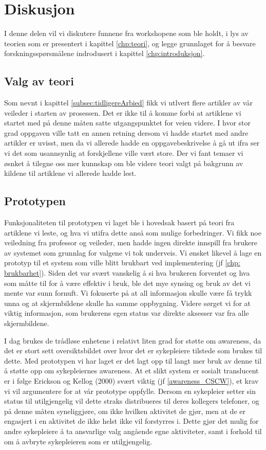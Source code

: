 \chapter{Diskusjon}
\label{chp:diskusjon}
I denne delen vil vi diskutere funnene fra workshopene som ble holdt, i lys av teorien som er presentert i kapittel \ref{chp:teori}, og legge grunnlaget for å besvare forskningsspørsmålene indrodusert i kapittel \ref{chp:introduksjon}.

\section{Valg av teori}
Som nevnt i kapittel \ref{subsec:tidligereArbied} fikk vi utlvert flere artikler av vår veileder i starten av prosessen. Det er ikke til å komme forbi at artiklene vi startet med på denne måten satte utgangspunktet for veien videre. I hvor stor grad oppgaven ville tatt en annen retning dersom vi hadde startet med andre artikler er uvisst, men da vi allerede hadde en oppgavebeskrivelse å gå ut ifra ser vi det som usannsynlig at forskjellene ville vært store.
Der vi fant temaer vi øsnket å tilegne oss mer kunnskap om ble videre teori valgt på bakgrunn av kildene til artiklene vi allerede hadde lest. 

\section{Prototypen}
\label{protoDisk}
Funksjonaliteten til prototypen vi laget ble i hovedsak basert på teori fra artiklene vi leste, og hva vi utifra dette anså som mulige forbedringer. Vi fikk noe veiledning fra professor og veileder, men hadde ingen direkte innspill fra brukere av systemet som grunnlag for valgene vi tok underveis.
Vi ønsket likevel å lage en prototyp til et system som ville blitt brukbart ved implementering (jf \ref{chp: brukbarhet}). Siden det var svært vanskelig å si hva brukeren forventet og hva som måtte til for å være effektiv i bruk, ble det mye synsing og bruk av det vi mente var sunn fornuft. Vi fokuserte på at all informasjon skulle være få trykk unna og at skjermbildene skulle ha samme oppbygning. Videre sørget vi for at viktig informasjon, som brukerens egen status var direkte aksesser var fra alle skjermbildene. 

\noindent
I dag brukes de trådløse enhetene i relativt liten grad for støtte om awareness, da det er stort sett oversiktsbildet over hvor det er sykepleiere tilstede som brukes til dette. Med prototypen vi har laget er det lagt opp til langt mer bruk av denne til å støtte opp om sykepleiernes awareness. At et slikt system er sosialt translucent er i følge Erickson og Kellog (2000) svært viktig (jf \ref{awareness_CSCW}), et krav vi vil argumentere for at vår prototype oppfylle. Dersom en sykepleier setter sin status til utilgjengelig vil dette straks distribueres til deres kollegers telefoner, og på denne måten syneliggjøre, om ikke hvilken aktivitet de gjør, men at de er engasjert i en aktivitet de ikke helst ikke vil forstyrres i. Dette gjør det mulig for andre sykepleiere å ta ansvarlige valg angående egne aktiviteter, samt i forhold til om å avbryte sykepleieren som er utilgjengelig. 

